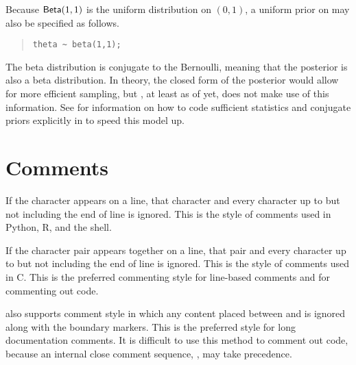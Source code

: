 Because $\mbox{\sf Beta}(1,1)$ is the uniform distribution on $(0,1)$,
a uniform prior on  may also be specified as follows.
%
\begin{quote}
\begin{Verbatim}
theta ~ beta(1,1);
\end{Verbatim}
\end{quote}
%
The beta distribution is conjugate to the Bernoulli, meaning that the
posterior is also a beta distribution.  In theory, the closed form of
the posterior would allow for more efficient sampling, but \Stan,
at least as of yet, does not make use of this information.  See
 for information on how to code sufficient
statistics and conjugate priors explicitly in \Stan to speed this model up.





\section{Comments}

If the character \code{\#} appears on a line, that character and every
character up to but not including the end of line is ignored.  This is
the style of comments used in Python, R, and the shell.  

If the character pair \code{//} appears together on a line, that pair
and every character up to but not including the end of line is
ignored.  This is the style of comments used in C.  This is the
preferred commenting style for line-based comments and for commenting
out code.

\Stan also supports \Cpp comment style in which any content placed
between \code{/*} and \code{*/} is ignored along with the boundary
markers.  This is the preferred style for long documentation comments.
It is difficult to use this method to comment out code, because 
an internal close comment sequence, \code{*/}, may take precedence.






